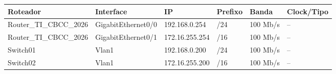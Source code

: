 \begin{tabular}{llllll}
\toprule
Roteador & Interface & IP & Prefixo & Banda & Clock/Tipo\\
\midrule
Router\_TI\_CBCC\_2026 & GigabitEthernet0/0 & 192.168.0.254 & /24 & 100 Mb/s & --\\
Router\_TI\_CBCC\_2026 & GigabitEthernet0/1 & 172.16.255.254 & /16 & 100 Mb/s & --\\
\midrule
Switch01 & Vlan1 & 192.168.0.200 & /24 & 100 Mb/s & --\\
\midrule
Switch02 & Vlan1 & 172.16.255.200 & /16 & 100 Mb/s & --\\
\bottomrule
\end{tabular}
